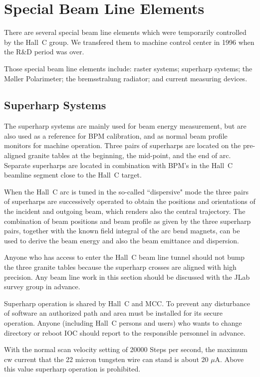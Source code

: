 {\section{Special Beam Line Elements}

There are several special beam line elements which were temporarily
controlled by the Hall~C group. We transfered them to machine
control center in 1996 when the R\&D period was over.

Those special beam line elements include:  raster systems; superharp systems; the M\o ller 
Polarimeter; the bremsstralung radiator; and current measuring devices.

\subsection{Superharp Systems}

The superharp systems are mainly used for beam energy measurement,
but are also used as a reference for BPM calibration, and as
normal beam profile monitors for machine operation. Three pairs
of superharps are located on the pre-aligned granite tables at the
beginning, the mid-point, and the end of arc.
Separate superharps are located in combination with BPM's in the
Hall~C beamline segment close to the Hall~C target.

When the Hall~C arc is tuned in the so-called ``dispersive" mode
the three pairs of superharps are successively operated to obtain
the positions and orientations of the incident and outgoing beam,
which renders also the central trajectory. The combination of
beam positions and beam profile as given by the three superharp
pairs, together with the known field integral of the arc bend
magnets, can be used to derive the beam energy and also the beam
emittance and dispersion.

Anyone who has access to enter the Hall~C beam line tunnel should
not bump the three granite tables because the superharp
crosses are aligned with high precision. Any beam line work in this
section should be discussed with the JLab survey group in advance.

Superharp operation is shared by Hall~C and MCC. To prevent any
disturbance of software an authorized path and area must be
installed for its secure operation. Anyone (including Hall~C persons
and users) who wants to change directory or reboot IOC should
report to the responsible personnel
in advance.

With the normal scan velocity setting of 20000 Steps per second, the
maximum cw current that the 22 micron tungsten wire can stand is about
20 $\mu$A. Above this value superharp operation is prohibited.

}
